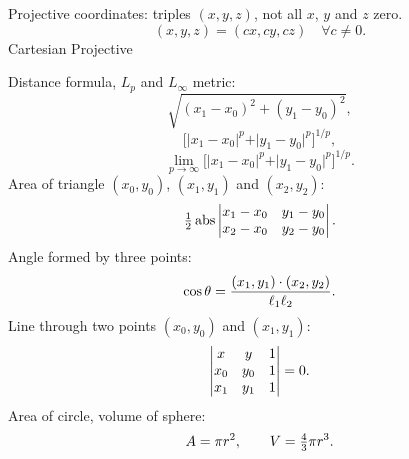 Projective coordinates: triples $(x,y,z)$,
not all $x$, $y$ and $z$ zero.
$$(x,y,z) = (cx,cy,cz) \quad \forall c \neq 0.$$
Cartesian \qquad Projective
\Hrule
{}

Distance formula, $L_p$ and $L_\infty$ metric:
$$
\sqrt{(x_1 - x_0)^2 + (y_1 - y_0)^2},
$$
$$
\big[ \vert x_1 - x_0 \vert^p + \vert y_1 - y_0 \vert^p \big]^{1/p},
$$
$$
\lim_{p \to \infty} \big[ \vert x_1 - x_0 \vert^p + \vert y_1 - y_0 \vert^p \big]^{1/p}.
$$
Area of triangle $(x_0,y_0)$, $(x_1,y_1)$ and $(x_2,y_2)$:
$$
\sfrac 1 2
\abs
\left\vert
\begin{matrix}
x_1-x_0 &y_1-y_0  \cr
x_2-x_0 &y_2-y_0  \cr
\end{matrix}
\right\vert.
$$
Angle formed by three points:
\vskip3pt
$$
\cos \theta = {(x_1, y_1) \cdot (x_2, y_2) \over \ell_1 \ell_2}.
$$
Line through two points $(x_0,y_0)$ and $(x_1,y_1)$:
$$
\left\vert
\begin{matrix}
x &y & 1\cr
x_0 &y_0 & 1\cr
x_1 &y_1 & 1\cr
\end{matrix}
\right\vert = 0.
$$
Area of circle, volume of sphere:
$$ A= \pi r^2, \qquad V= \sfrac 4 3 \pi r^3.$$
